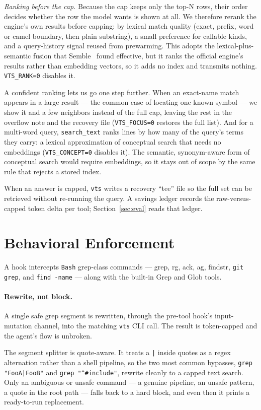 \documentclass[11pt]{article}
\begin{document}
\emph{Ranking before the cap.} Because the cap keeps only the top-N rows, their
order decides whether the row the model wants is shown at all. We therefore rerank
the engine's own results before capping: by lexical match quality (exact, prefix,
word or camel boundary, then plain substring), a small preference for callable
kinds, and a query-history signal reused from prewarming. This adopts the
lexical-plus-semantic fusion that Semble~\cite{semble-hn} found effective, but it
ranks the official engine's results rather than embedding vectors, so it adds no
index and transmits nothing. \texttt{VTS\_RANK=0} disables it.

A confident ranking lets us go one step further. When an exact-name match appears in
a large result --- the common case of locating one known symbol --- we show it and
a few neighbors instead of the full cap, leaving the rest in the overflow note and
the recovery file (\texttt{VTS\_FOCUS=0} restores the full list). And for a
multi-word query, \texttt{search\_text} ranks lines by how many of the query's terms
they carry: a lexical approximation of conceptual search that needs no embeddings
(\texttt{VTS\_CONCEPT=0} disables it). The semantic, synonym-aware form of
conceptual search would require embeddings, so it stays out of scope by the same
rule that rejects a stored index.

When an answer is capped, \texttt{vts} writes a recovery ``tee'' file so the full
set can be retrieved without re-running the query. A savings ledger records the
raw-versus-capped token delta per tool; Section~\ref{sec:eval} reads that ledger.

\section{Behavioral Enforcement}
\label{sec:enforce}

A hook intercepts \texttt{Bash} grep-class commands --- grep, rg, ack, ag, findstr,
\texttt{git grep}, and \texttt{find -name} --- along with the built-in Grep and Glob
tools.

\paragraph{Rewrite, not block.}
A single safe grep segment is rewritten, through the pre-tool hook's input-mutation
channel, into the matching \texttt{vts} CLI call. The result is token-capped and the
agent's flow is unbroken.

The segment splitter is quote-aware. It treats a \texttt{|} inside quotes as a regex
alternation rather than a shell pipeline, so the two most common bypasses,
\texttt{grep "FooA|FooB"} and \texttt{grep "\^{}\#include"}, rewrite cleanly to a
capped text search. Only an ambiguous or unsafe command --- a genuine pipeline, an
unsafe pattern, a quote in the root path --- falls back to a hard block, and even
then it prints a ready-to-run replacement.
\end{document}
